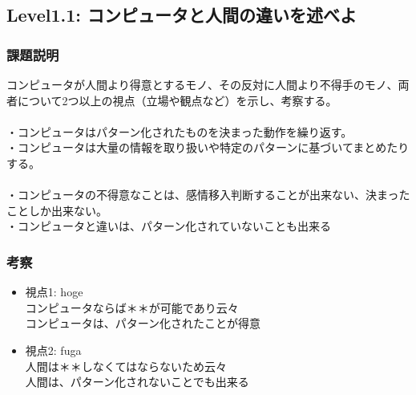 \subsection{Level1.1: コンピュータと人間の違いを述べよ}
\subsubsection{課題説明}
コンピュータが人間より得意とするモノ、その反対に人間より不得手のモノ、両者について2つ以上の視点（立場や観点など）を示し、考察する。\\
\\
・コンピュータはパターン化されたものを決まった動作を繰り返す。\\
・コンピュータは大量の情報を取り扱いや特定のパターンに基づいてまとめたりする。\\
\\
・コンピュータの不得意なことは、感情移入判断することが出来ない、決まったことしか出来ない。\\
・コンピュータと違いは、パターン化されていないことも出来る
\subsubsection{考察}
\begin{itemize}
 \item 視点1: hoge\\
コンピュータならば＊＊が可能であり云々\\
コンピュータは、パターン化されたことが得意\\
 \item 視点2: fuga\\
人間は＊＊しなくてはならないため云々\\
人間は、パターン化されないことでも出来る
\end{itemize}

